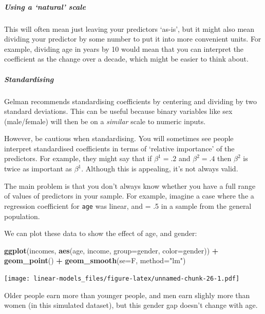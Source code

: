 \documentclass[]{article}
\newenvironment{Shaded}{\begin{snugshade}}{\end{snugshade}}
\newcommand{\DataTypeTok}[1]{\textcolor[rgb]{0.13,0.29,0.53}{#1}}
\newcommand{\KeywordTok}[1]{\textcolor[rgb]{0.13,0.29,0.53}{\textbf{#1}}}
\newcommand{\NormalTok}[1]{#1}
\newcommand{\OperatorTok}[1]{\textcolor[rgb]{0.81,0.36,0.00}{\textbf{#1}}}
\newcommand{\StringTok}[1]{\textcolor[rgb]{0.31,0.60,0.02}{#1}}
\let\oldsubparagraph\subparagraph
\renewcommand{\subparagraph}[1]{\oldsubparagraph{#1}\mbox{}}
\begin{document}
\hypertarget{using-a-natural-scale}{%
\subparagraph{Using a `natural' scale}\label{using-a-natural-scale}}

This will often mean just leaving your predictors `as-is', but it might also
mean dividing your predictor by some number to put it into more convenient
units. For example, dividing age in years by 10 would mean that you can
interpret the coefficient as the change over a decade, which might be easier to
think about.

\hypertarget{standardising}{%
\subparagraph{Standardising}\label{standardising}}

Gelman \citep{gelman2008scaling} recommends standardising coefficients by centering
and dividing by two standard deviations. This can be useful because binary
variables like sex (male/female) will then be on a \emph{similar} scale to numeric
inputs.

However, be cautious when standardising. You will sometimes see people interpret
standardised coefficients in terms of `relative importance' of the predictors.
For example, they might say that if \(\beta^{1}= .2\) and \(\beta^{2} = .4\) then
\(\beta^{2}\) is twice as important as \(\beta^{1}\). Although this is appealing,
it's not always valid.

The main problem is that you don't always know whether you have a full range of
values of predictors in your sample. For example, imagine a case where the a
regression coefficient for \texttt{age} was linear, and = .5 in a sample from the
general population.

We can plot these data to show the effect of age, and gender:

\begin{Shaded}
\begin{Highlighting}[]
\KeywordTok{ggplot}\NormalTok{(incomes, }\KeywordTok{aes}\NormalTok{(age, income, }\DataTypeTok{group=}\NormalTok{gender, }\DataTypeTok{color=}\NormalTok{gender)) }\OperatorTok{+}\StringTok{ }\KeywordTok{geom_point}\NormalTok{() }\OperatorTok{+}\StringTok{ }\KeywordTok{geom_smooth}\NormalTok{(}\DataTypeTok{se=}\NormalTok{F, }\DataTypeTok{method=}\StringTok{"lm"}\NormalTok{)}
\end{Highlighting}
\end{Shaded}

\texttt{[image: linear-models\_files/figure-latex/unnamed-chunk-26-1.pdf]}

Older people earn more than younger people, and men earn slighly more than women
(in this simulated dataset), but this gender gap doesn't change with age.
\end{document}

